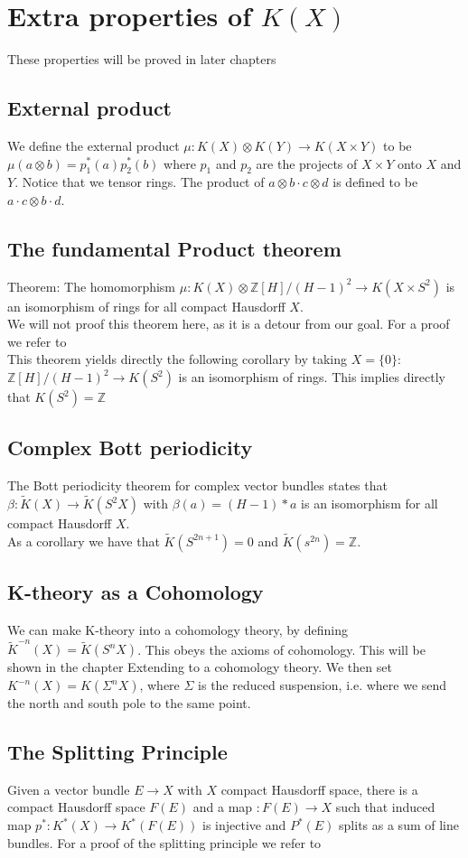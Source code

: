 \documentclass[../Thesis.tex]{subfiles}
\begin{document}
\section{Extra properties of $K(X)$}
These properties will be proved in later chapters
\subsection{External product}
We define the external product $\mu : K(X) \otimes K(Y) \rightarrow K(X \times Y)$ to be $\mu( a \otimes b) = p_1^*(a) p_2^*(b)$ where $p_1$ and $p_2$ are the projects of $X \times Y$ onto $X$ and $Y$. Notice that we tensor rings. The product of $a \otimes b \cdot c \otimes d$ is defined to be $ a \cdot c \otimes b \cdot d$.
\subsection{The fundamental Product theorem}
Theorem: The homomorphism $\mu:K(X) \otimes \mathbb{Z}[H]/(H-1)^2 \rightarrow K(X \times S^2)$ is an isomorphism of rings for all compact Hausdorff $X$.
\\We will not proof this theorem here, as it is a detour from our goal. For a proof we refer to \cite{VBKT}
\\This theorem yields directly the following corollary by taking $X = \{0\}$:
\\$\mathbb{Z}[H]/(H-1)^2 \rightarrow K(S^2)$ is an isomorphism of rings. This implies directly that $K(S^2) = \mathbb{Z}$
\subsection{Complex Bott periodicity}
The Bott periodicity theorem for complex vector bundles states that $\beta: \tilde{K}(X) \rightarrow \tilde{K}(S^2 X)$ with $\beta(a) = (H-1) * a$ is an isomorphism for all compact Hausdorff $X$.
\\As a corollary we have that $\tilde{K}(S^{2n + 1}) = 0$ and $\tilde{K}(s^{2n}) = \mathbb{Z}$.
\subsection{K-theory as a Cohomology}
We can make K-theory into a cohomology theory, by defining $\tilde{K}^{-n} (X) = \tilde{K}(S^n X)$. This obeys the axioms of cohomology. This will be shown in the chapter Extending to a cohomology theory. We then set $K^{-n}(X) = K(\Sigma^n X)$, where $\Sigma$ is the reduced suspension, i.e. where we send the north and south pole to the same point.
\subsection{The Splitting Principle}
Given a vector bundle $E \rightarrow X$ with $X$ compact Hausdorff space, there is a compact Hausdorff space $F(E)$ and a map $: F(E) \rightarrow X$ such that induced map $p^* : K^*(X)  \rightarrow K^*(F(E))$ is injective and $P^*(E)$ splits as a sum of line bundles. For a proof of the splitting principle we refer to \cite{VBKT}
\end{document}
